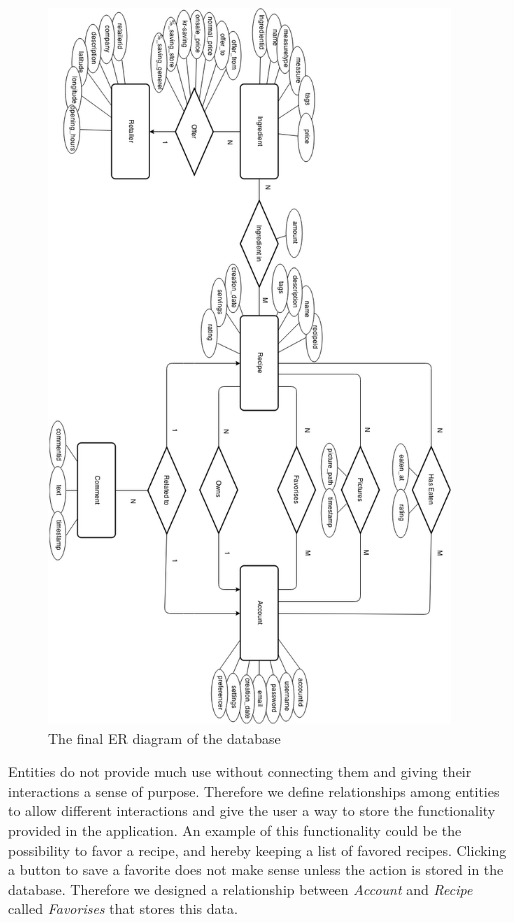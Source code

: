 \begin{figure}
\centering
\includegraphics[width=0.95\textwidth]{Pictures/ERdiagram}
\caption{The final ER diagram of the database}
\label{fig:ER-diagram}
\end{figure}

Entities do not provide much use without connecting them and giving their interactions a sense of purpose. Therefore we define relationships among entities to allow different interactions and give the user a way to store the functionality provided in the application. An example of this functionality could be the possibility to favor a recipe, and hereby keeping a list of favored recipes. Clicking a button to save a favorite does not make sense unless the action is stored in the database. Therefore we designed a relationship between \textit{Account} and \textit{Recipe} called \textit{Favorises} that stores this data.

